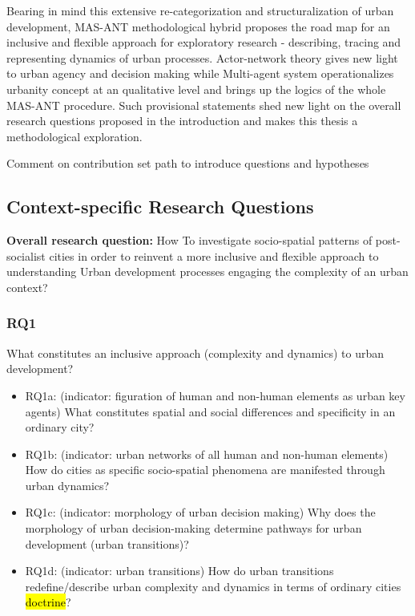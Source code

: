 \documentclass[11pt]{report}
\begin{document}
Bearing in mind this extensive re-categorization and structuralization of urban development, MAS-ANT methodological hybrid proposes the road map for an inclusive and flexible approach for exploratory research - describing, tracing and representing dynamics of urban processes. Actor-network theory gives new light to urban agency and decision making while Multi-agent system operationalizes urbanity concept at an qualitative level and brings up the logics of the whole MAS-ANT procedure. Such provisional statements shed new light on the overall research questions proposed in the introduction and makes this thesis a methodological exploration.

Comment on contribution
set path to introduce questions and hypotheses
\subsection{Context-specific Research Questions}

\textbf{Overall research question:} How To investigate socio-spatial patterns of post-socialist cities in order to reinvent a more inclusive and flexible approach to understanding Urban development processes engaging the complexity of an urban context? 

\subsubsection{RQ1}
What constitutes an inclusive approach (complexity and dynamics) to urban development?
\begin{itemize}
\item RQ1a: (indicator: figuration of human and non-human elements as urban key agents) What constitutes spatial and social differences and specificity in an ordinary city? 
\item RQ1b: (indicator: urban networks of all human and non-human elements) How do cities as specific socio-spatial phenomena are manifested through urban dynamics?
\item RQ1c: (indicator: morphology of urban decision making) Why does the morphology of urban decision-making determine pathways for urban development (urban transitions)?
\item RQ1d: (indicator: urban transitions) How do urban transitions redefine/describe urban complexity and dynamics in terms of ordinary cities \hl{doctrine}?
\end {itemize}
\end{document}
